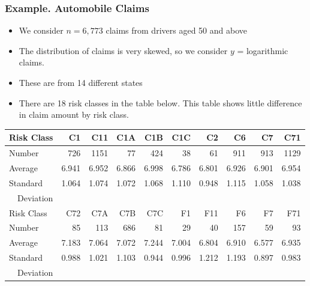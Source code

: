 \begin{frame}%
 \frametitle{Example. Automobile Claims}
   \begin{itemize}
    \item We consider $n=6,773$ claims from drivers aged 50
    and above
    \item The distribution of claims is very skewed, so we consider
    $y$ = logarithmic claims.
    \item These are from 14 different states
    \item There are 18 risk classes in the table below. This table
    shows little difference in claim amount by risk class.
       \end{itemize}
\begin{tabular}{l|rrrrrrrrr}
\hline
Risk Class &         C1 &        C11 &        C1A &        C1B &        C1C &         C2 &         C6 &         C7 &        C71 \\
 \hline   Number &        726 &       1151 &         77 &        424 &         38 &         61 &        911 &        913 &       1129 \\
   Average &      6.941 &      6.952 &      6.866 &      6.998 &      6.786 &      6.801 &      6.926 &      6.901 &      6.954 \\
 Standard  &      1.064 &      1.074 &      1.072 &      1.068 &      1.110 &      0.948 &      1.115 &      1.058 &      1.038 \\
 ~~Deviation &            &            &            &            &            &            &            &            &            \\
\hline
Risk Class &        C72 &        C7A &        C7B &        C7C &         F1 &        F11 &         F6 &         F7 &        F71 \\
 \hline   Number &         85 &        113 &        686 &         81 &         29 &         40 &        157 &         59 &         93 \\
   Average &      7.183 &      7.064 &      7.072 &      7.244 &      7.004 &      6.804 &      6.910 &      6.577 &      6.935 \\
 Standard  &      0.988 &      1.021 &      1.103 &      0.944 &      0.996 &      1.212 &      1.193 &      0.897 &      0.983 \\
 ~~Deviation &            &            &            &            &            &            &            &            &            \\
\hline
\end{tabular}

\end{frame}

